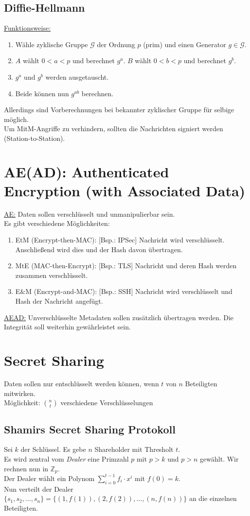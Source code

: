 \subsection{Diffie-Hellmann}
\underline{Funktionsweise:}
\begin{enumerate}
	\item Wähle zyklische Gruppe $\mathcal{G}$ der Ordnung $p$ (prim) und einen Generator $g\in\mathcal{G}$.
	\item $A$ wählt $0<a<p$ und berechnet $g^a$. $B$ wählt $0<b<p$ und berechnet $g^b$.
	\item $g^a$ und $g^b$ werden ausgetauscht.
	\item Beide können nun $g^{ab}$ berechnen.
\end{enumerate}
Allerdings sind Vorberechnungen bei bekannter zyklischer Gruppe für selbige möglich.\\
Um MitM-Angriffe zu verhindern, sollten die Nachrichten signiert werden (Station-to-Station).

\section{AE(AD): Authenticated Encryption (with Associated Data)}
\underline{AE:} Daten sollen verschlüsselt und unmanipulierbar sein.\\
Es gibt verschiedene Möglichkeiten:
\begin{enumerate}
	\item EtM (Encrypt-then-MAC): [Bsp.: IPSec] Nachricht wird verschlüsselt. Anschließend wird dies und der Hash davon übertragen.
	\item MtE (MAC-then-Encrypt): [Bsp.: TLS] Nachricht und deren Hash werden zusammen verschlüsselt.
	\item E\&M (Encrypt-and-MAC): [Bsp.: SSH] Nachricht wird verschlüsselt und Hash der Nachricht angefügt.
\end{enumerate}
\underline{AEAD:} Unverschlüsselte Metadaten sollen zusätzlich übertragen werden. Die Integrität soll weiterhin gewährleistet sein.

\section{Secret Sharing}
Daten sollen nur entschlüsselt werden können, wenn $t$ von $n$ Beteiligten mitwirken.\\
Möglichkeit: $\binom{n}{t}$ verschiedene Verschlüsselungen

\subsection{Shamirs Secret Sharing Protokoll}
Sei $k$ der Schlüssel. Es gebe $n$ Shareholder mit Thresholt $t$.\\
Es wird zentral vom \textit{Dealer} eine Primzahl $p$ mit $p>k$ und $p>n$ gewählt. Wir rechnen nun in $\mathbb{Z}_p$.\\
Der Dealer wählt ein Polynom $\sum\limits_{i=0}^{t-1}f_i\cdot x^i$ mit $f(0)=k$.\\Nun verteilt der Dealer $\{s_1,s_2,...,s_n\}=\{(1,f(1)),(2,f(2)),...,(n,f(n))\}$ an die einzelnen Beteiligten.



